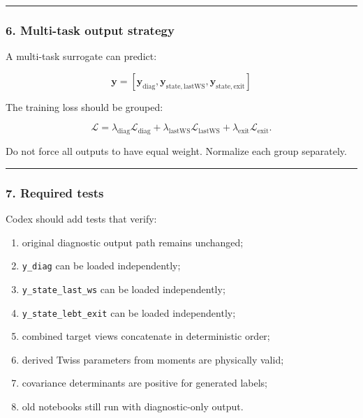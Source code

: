 \documentclass[
]{article}
\providecommand{\tightlist}{%
  \setlength{\itemsep}{0pt}\setlength{\parskip}{0pt}}
\begin{document}
\begin{center}\rule{0.5\linewidth}{0.5pt}\end{center}

\hypertarget{multi-task-output-strategy}{%
\subsubsection{6. Multi-task output
strategy}\label{multi-task-output-strategy}}

A multi-task surrogate can predict:

\[
\mathbf{y}
=
[
\mathbf{y}_{\mathrm{diag}},
\mathbf{y}_{\mathrm{state,lastWS}},
\mathbf{y}_{\mathrm{state,exit}}
]
\]

The training loss should be grouped:

\[
\mathcal{L}
=
\lambda_{\mathrm{diag}}\mathcal{L}_{\mathrm{diag}}
+
\lambda_{\mathrm{lastWS}}\mathcal{L}_{\mathrm{lastWS}}
+
\lambda_{\mathrm{exit}}\mathcal{L}_{\mathrm{exit}}.
\]

Do not force all outputs to have equal weight. Normalize each group
separately.

\begin{center}\rule{0.5\linewidth}{0.5pt}\end{center}

\hypertarget{required-tests-1}{%
\subsubsection{7. Required tests}\label{required-tests-1}}

Codex should add tests that verify:

\begin{enumerate}
\def\labelenumi{\arabic{enumi}.}
\tightlist
\item
  original diagnostic output path remains unchanged;
\item
  \texttt{y\_diag} can be loaded independently;
\item
  \texttt{y\_state\_last\_ws} can be loaded independently;
\item
  \texttt{y\_state\_lebt\_exit} can be loaded independently;
\item
  combined target views concatenate in deterministic order;
\item
  derived Twiss parameters from moments are physically valid;
\item
  covariance determinants are positive for generated labels;
\item
  old notebooks still run with diagnostic-only output.
\end{enumerate}
\end{document}
